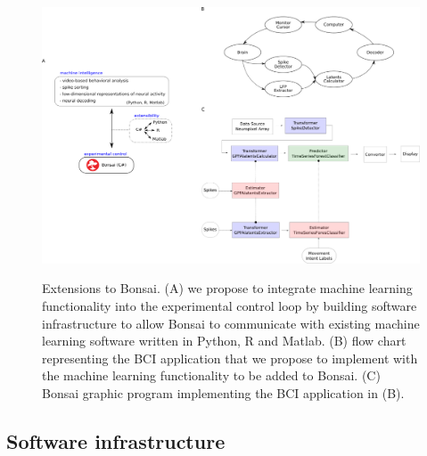 \begin{figure} \begin{center}

    \href{http://www.gatsby.ucl.ac.uk/~rapela/bbsrc-bbr21/proposed_bonsai_extensions_combined.png}{\includegraphics[width=5in]{figures/proposed_bonsai_extensions_combined.png}}

    \caption{Extensions to Bonsai. (A) we propose to integrate machine learning
    functionality into the experimental control loop by building software
    infrastructure to allow Bonsai to communicate with existing machine
    learning software written in Python, R and Matlab. (B) flow chart
    representing the BCI application that we propose to implement with the
    machine learning functionality to be added to Bonsai. (C) Bonsai graphic
    program implementing the BCI application in (B).}

        \label{fig:proposedBonsaiExtensions}
    \end{center}
\end{figure}


\subsection{Software infrastructure}
\label{sec:infrastructure}

